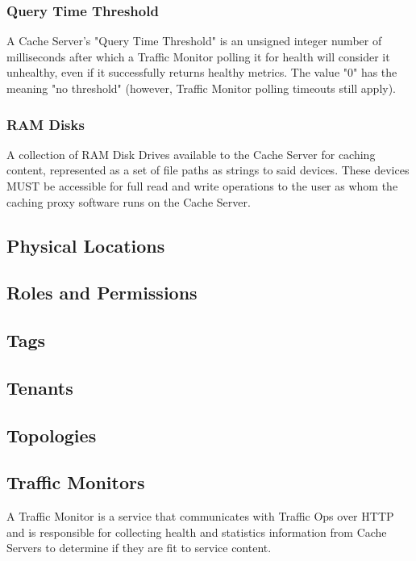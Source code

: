 \subsubsection{Query Time Threshold}
A Cache Server's "Query Time Threshold" is an unsigned integer number of
milliseconds after which a Traffic Monitor polling it for health will consider
it unhealthy, even if it successfully returns healthy metrics. The value "0" has
the meaning "no threshold" (however, Traffic Monitor polling timeouts still
apply).

\subsubsection{RAM Disks}
A collection of RAM Disk Drives available to the Cache Server for caching
content, represented as a set of file paths as strings to said devices. These
devices MUST be accessible for full read and write operations to the user as
whom the caching proxy software runs on the Cache Server.

\subsection{Physical Locations}



\subsection{Roles and Permissions\label{sec:roles-and-perms}}



\subsection{Tags}



\subsection{Tenants}


\subsection{Topologies}


\subsection{Traffic Monitors}
A Traffic Monitor is a service that communicates with Traffic Ops over HTTP and
is responsible for collecting health and statistics information from Cache
Servers to determine if they are fit to service content.

